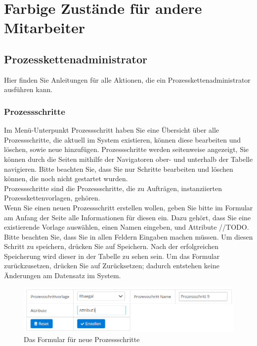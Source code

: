 \documentclass[enabledeprecatedfontcommands,fontsize=12pt,paper=a4,twoside]{scrartcl}
\begin{document}
\newpage
\section{Farbige Zustände für andere Mitarbeiter}
\subsection{Prozesskettenadministrator}

Hier finden Sie Anleitungen für alle Aktionen, die ein Prozesskettenadministrator ausführen kann.
\subsubsection{Prozessschritte}

Im Menü-Unterpunkt Prozessschritt haben Sie eine Übersicht über alle Prozessschritte, die aktuell im System existieren, können diese bearbeiten und löschen, sowie neue hinzufügen. Prozessschritte werden seitenweise angezeigt, Sie können durch die Seiten mithilfe der Navigatoren ober- und unterhalb der Tabelle navigieren. Bitte beachten Sie, dass Sie nur Schritte bearbeiten und löschen können, die noch nicht gestartet wurden. \\

Prozessschritte sind die Prozessschritte, die zu Aufträgen, instanziierten Prozesskettenvorlagen, gehören. \\

Wenn Sie einen neuen Prozessschritt erstellen wollen, geben Sie bitte im Formular am Anfang der Seite alle Informationen für diesen ein. Dazu gehört, dass Sie eine existierende Vorlage auswählen, einen Namen eingeben, und Attribute //TODO. Bitte beachten Sie, dass Sie in allen Feldern Eingaben machen müssen. Um diesen Schritt zu speichern, drücken Sie auf Speichern. Nach der erfolgreichen Speicherung wird dieser in der Tabelle zu sehen sein. Um das Formular zurückzusetzen, drücken Sie auf Zurücksetzen; dadurch entstehen keine Änderungen am Datensatz im System. \\

\begin{figure}[h!]
\begin{center}
 \includegraphics[width=\textwidth]{screenshots/pk/01prozessschrittformular.png}
  \caption{Das Formular für neue Prozessschritte}
  \label{fig:boat2}
\end{center}
\end{figure}
\end{document}

